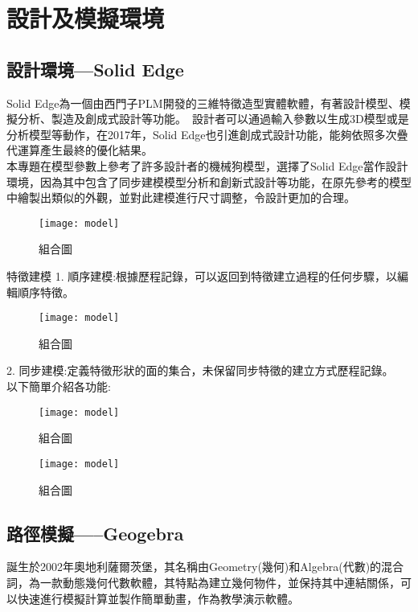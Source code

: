 \chapter{設計及模擬環境}

\section{設計環境---Solid Edge}
Solid Edge為一個由西門子PLM開發的三維特徵造型實體軟體，有著設計模型、模擬分析、製造及創成式設計等功能。\
設計者可以通過輸入參數以生成3D模型或是分析模型等動作，在2017年，Solid Edge也引進創成式設計功能，能夠依照多次疊代運算產生最終的優化結果。\\

本專題在模型參數上參考了許多設計者的機械狗模型，選擇了Solid Edge當作設計環境，因為其中包含了同步建模模型分析和創新式設計等功能，在原先參考的模型中繪製出類似的外觀，並對此建模進行尺寸調整，令設計更加的合理。\\

\begin{figure}[hbt!]
\center
\texttt{[image: model]}
\caption{\Large 組合圖}
\label{model}
\end{figure}

\qquad 特徵建模
1. 順序建模:根據歷程記錄，可以返回到特徵建立過程的任何步驟，以編輯順序特徵。\\

\begin{figure}[hbt!]
\center
\texttt{[image: model]}
\caption{\Large 組合圖}
\label{model}
\end{figure}

2. 同步建模:定義特徵形狀的面的集合，未保留同步特徵的建立方式歷程記錄。\\

以下簡單介紹各功能:\\

\begin{figure}[hbt!]
\center
\texttt{[image: model]}
\caption{\Large 組合圖}
\label{model}
\end{figure}

\begin{figure}[hbt!]
\center
\texttt{[image: model]}
\caption{\Large 組合圖}
\label{model}
\end{figure}

\section{路徑模擬-----Geogebra}
誕生於2002年奧地利薩爾茨堡，其名稱由Geometry(幾何)和Algebra(代數)的混合詞，為一款動態幾何代數軟體，其特點為建立幾何物件，並保持其中連結關係，可以快速進行模擬計算並製作簡單動畫，作為教學演示軟體。\\

